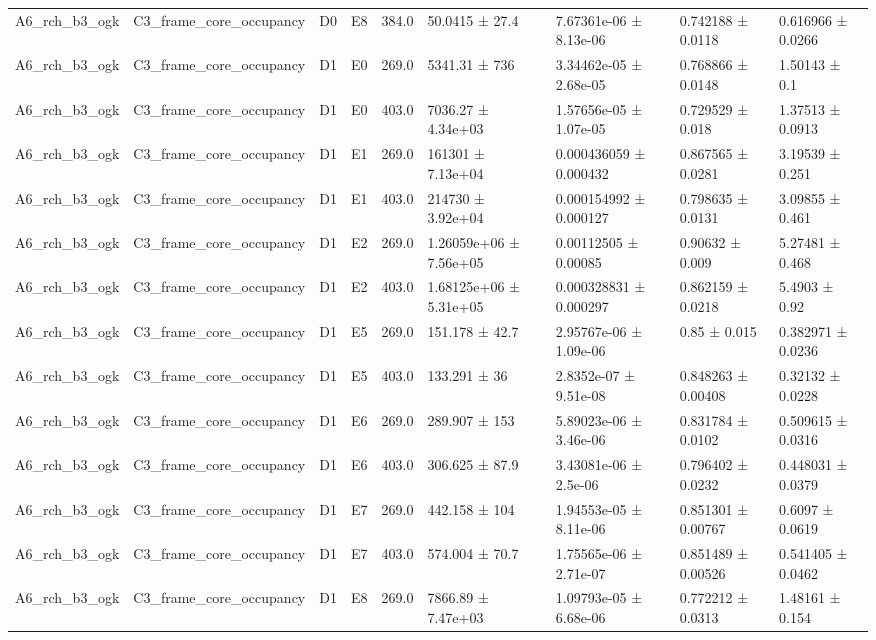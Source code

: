 \begin{table}
\begin{tabular}{lllllllll}
A6\_rch\_b3\_ogk & C3\_frame\_core\_occupancy & D0 & E8 & 384.0 & 50.0415 ± 27.4 & 7.67361e-06 ± 8.13e-06 & 0.742188 ± 0.0118 & 0.616966 ± 0.0266 \\
A6\_rch\_b3\_ogk & C3\_frame\_core\_occupancy & D1 & E0 & 269.0 & 5341.31 ± 736 & 3.34462e-05 ± 2.68e-05 & 0.768866 ± 0.0148 & 1.50143 ± 0.1 \\
A6\_rch\_b3\_ogk & C3\_frame\_core\_occupancy & D1 & E0 & 403.0 & 7036.27 ± 4.34e+03 & 1.57656e-05 ± 1.07e-05 & 0.729529 ± 0.018 & 1.37513 ± 0.0913 \\
A6\_rch\_b3\_ogk & C3\_frame\_core\_occupancy & D1 & E1 & 269.0 & 161301 ± 7.13e+04 & 0.000436059 ± 0.000432 & 0.867565 ± 0.0281 & 3.19539 ± 0.251 \\
A6\_rch\_b3\_ogk & C3\_frame\_core\_occupancy & D1 & E1 & 403.0 & 214730 ± 3.92e+04 & 0.000154992 ± 0.000127 & 0.798635 ± 0.0131 & 3.09855 ± 0.461 \\
A6\_rch\_b3\_ogk & C3\_frame\_core\_occupancy & D1 & E2 & 269.0 & 1.26059e+06 ± 7.56e+05 & 0.00112505 ± 0.00085 & 0.90632 ± 0.009 & 5.27481 ± 0.468 \\
A6\_rch\_b3\_ogk & C3\_frame\_core\_occupancy & D1 & E2 & 403.0 & 1.68125e+06 ± 5.31e+05 & 0.000328831 ± 0.000297 & 0.862159 ± 0.0218 & 5.4903 ± 0.92 \\
A6\_rch\_b3\_ogk & C3\_frame\_core\_occupancy & D1 & E5 & 269.0 & 151.178 ± 42.7 & 2.95767e-06 ± 1.09e-06 & 0.85 ± 0.015 & 0.382971 ± 0.0236 \\
A6\_rch\_b3\_ogk & C3\_frame\_core\_occupancy & D1 & E5 & 403.0 & 133.291 ± 36 & 2.8352e-07 ± 9.51e-08 & 0.848263 ± 0.00408 & 0.32132 ± 0.0228 \\
A6\_rch\_b3\_ogk & C3\_frame\_core\_occupancy & D1 & E6 & 269.0 & 289.907 ± 153 & 5.89023e-06 ± 3.46e-06 & 0.831784 ± 0.0102 & 0.509615 ± 0.0316 \\
A6\_rch\_b3\_ogk & C3\_frame\_core\_occupancy & D1 & E6 & 403.0 & 306.625 ± 87.9 & 3.43081e-06 ± 2.5e-06 & 0.796402 ± 0.0232 & 0.448031 ± 0.0379 \\
A6\_rch\_b3\_ogk & C3\_frame\_core\_occupancy & D1 & E7 & 269.0 & 442.158 ± 104 & 1.94553e-05 ± 8.11e-06 & 0.851301 ± 0.00767 & 0.6097 ± 0.0619 \\
A6\_rch\_b3\_ogk & C3\_frame\_core\_occupancy & D1 & E7 & 403.0 & 574.004 ± 70.7 & 1.75565e-06 ± 2.71e-07 & 0.851489 ± 0.00526 & 0.541405 ± 0.0462 \\
A6\_rch\_b3\_ogk & C3\_frame\_core\_occupancy & D1 & E8 & 269.0 & 7866.89 ± 7.47e+03 & 1.09793e-05 ± 6.68e-06 & 0.772212 ± 0.0313 & 1.48161 ± 0.154 \\

\end{tabular}
\end{table}
